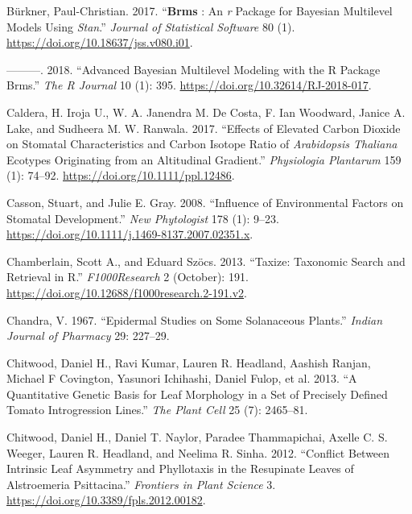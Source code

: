 \documentclass[
  12pt,
]{article}
\newlength{\cslhangindent}
\newlength{\cslentryspacingunit} %
\newenvironment{CSLReferences}[2] %
 {%
  \setlength{\parindent}{0pt}
  \ifodd #1
  \let\oldpar\par
  \def\par{\hangindent=\cslhangindent\oldpar}
  \fi
  \setlength{\parskip}{#2\cslentryspacingunit}
 }%
 {}
\begin{document}
\begin{CSLReferences}{1}{0}
\leavevmode{}%
Bürkner, Paul-Christian. 2017. {``\textbf{Brms} : {An} \emph{r} {Package} for {Bayesian} {Multilevel} {Models} {Using} \emph{Stan}.''} \emph{Journal of Statistical Software} 80 (1). \url{https://doi.org/10.18637/jss.v080.i01}.

\leavevmode{}%
---------. 2018. {``Advanced {Bayesian} {Multilevel} {Modeling} with the {R} {Package} Brms.''} \emph{The R Journal} 10 (1): 395. \url{https://doi.org/10.32614/RJ-2018-017}.

\leavevmode{}%
Caldera, H. Iroja U., W. A. Janendra M. De Costa, F. Ian Woodward, Janice A. Lake, and Sudheera M. W. Ranwala. 2017. {``Effects of Elevated Carbon Dioxide on Stomatal Characteristics and Carbon Isotope Ratio of \emph{{Arabidopsis} Thaliana} Ecotypes Originating from an Altitudinal Gradient.''} \emph{Physiologia Plantarum} 159 (1): 74--92. \url{https://doi.org/10.1111/ppl.12486}.

\leavevmode{}%
Casson, Stuart, and Julie E. Gray. 2008. {``Influence of Environmental Factors on Stomatal Development.''} \emph{New Phytologist} 178 (1): 9--23. \url{https://doi.org/10.1111/j.1469-8137.2007.02351.x}.

\leavevmode{}%
Chamberlain, Scott A., and Eduard Szöcs. 2013. {``Taxize: Taxonomic Search and Retrieval in {R}.''} \emph{F1000Research} 2 (October): 191. \url{https://doi.org/10.12688/f1000research.2-191.v2}.

\leavevmode{}%
Chandra, V. 1967. {``Epidermal Studies on Some {Solanaceous} Plants.''} \emph{Indian Journal of Pharmacy} 29: 227--29.

\leavevmode{}%
Chitwood, Daniel H., Ravi Kumar, Lauren R. Headland, Aashish Ranjan, Michael F Covington, Yasunori Ichihashi, Daniel Fulop, et al. 2013. {``A Quantitative Genetic Basis for Leaf Morphology in a Set of Precisely Defined Tomato Introgression Lines.''} \emph{The Plant Cell} 25 (7): 2465--81.

\leavevmode{}%
Chitwood, Daniel H., Daniel T. Naylor, Paradee Thammapichai, Axelle C. S. Weeger, Lauren R. Headland, and Neelima R. Sinha. 2012. {``Conflict Between {Intrinsic} {Leaf} {Asymmetry} and {Phyllotaxis} in the {Resupinate} {Leaves} of {Alstroemeria} Psittacina.''} \emph{Frontiers in Plant Science} 3. \url{https://doi.org/10.3389/fpls.2012.00182}.


\end{CSLReferences}
\end{document}
